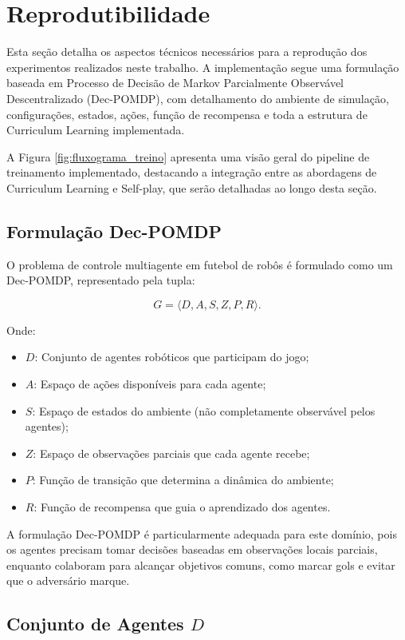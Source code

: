 \section{Reprodutibilidade}
\label{sec:reprodutibilidade}
Esta seção detalha os aspectos técnicos necessários para a reprodução dos experimentos realizados neste trabalho. A implementação segue uma formulação baseada em Processo de Decisão de Markov Parcialmente Observável Descentralizado (Dec-POMDP), com detalhamento do ambiente de simulação, configurações, estados, ações, função de recompensa e toda a estrutura de Curriculum Learning implementada.

A Figura \ref{fig:fluxograma_treino} apresenta uma visão geral do pipeline de treinamento implementado, destacando a integração entre as abordagens de Curriculum Learning e Self-play, que serão detalhadas ao longo desta seção.

\subsection{Formulação Dec-POMDP}

O problema de controle multiagente em futebol de robôs é formulado como um Dec-POMDP, representado pela tupla:

$$G = \langle D, A, S, Z, P, R \rangle.$$

Onde:
\begin{itemize}
    \item $D$: Conjunto de agentes robóticos que participam do jogo;
    \item $A$: Espaço de ações disponíveis para cada agente;
    \item $S$: Espaço de estados do ambiente (não completamente observável pelos agentes);
    \item $Z$: Espaço de observações parciais que cada agente recebe;
    \item $P$: Função de transição que determina a dinâmica do ambiente;
    \item $R$: Função de recompensa que guia o aprendizado dos agentes.
\end{itemize}

A formulação Dec-POMDP é particularmente adequada para este domínio, pois os agentes precisam tomar decisões baseadas em observações locais parciais, enquanto colaboram para alcançar objetivos comuns, como marcar gols e evitar que o adversário marque.

\subsection{Conjunto de Agentes $D$}

